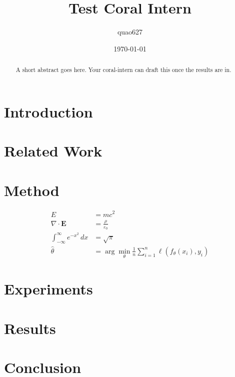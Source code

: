 \documentclass[11pt]{article}
\title{Test Coral Intern}
\author{quao627}
\date{\today}
\begin{document}
\maketitle

\begin{abstract}
A short abstract goes here. Your coral-intern can draft this once the
results are in.
\end{abstract}

\section{Introduction}

\section{Related Work}

\section{Method}
\begin{align}
    E &= mc^2 \\
    \nabla \cdot \mathbf{E} &= \frac{\rho}{\varepsilon_0} \\
    \int_{-\infty}^{\infty} e^{-x^2} \, dx &= \sqrt{\pi} \\
    \hat{\theta} &= \arg\min_{\theta} \frac{1}{n} \sum_{i=1}^{n} \ell(f_\theta(x_i), y_i)
\end{align}

\section{Experiments}

\section{Results}

\section{Conclusion}



\end{document}

